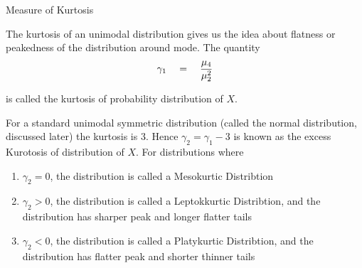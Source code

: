 \documentclass{article}
\begin{document}
\begin{ssection}{Measure of Kurtosis}

	The kurtosis of an unimodal distribution gives us the idea about flatness or peakedness of the distribution around mode. The quantity
	\begin{align*}
		\gamma_1	\quad = \quad	\frac{\mu_4}{\mu_2^2}
	\end{align*}

	is called the kurtosis of probability distribution of $X$. \br

	For a standard unimodal symmetric distribution (called the normal distribution, discussed later) the kurtosis is 3. Hence $\gamma_2 = \gamma_1 - 3$ is known as the excess Kurotosis of distribution of $X$. For distributions where \br

	\begin{enumerate}[label=(\roman*)]
		\item $\gamma_2 = 0$, the distribution is called a Mesokurtic Distribtion
		\item $\gamma_2 > 0$, the distribution is called a Leptokkurtic Distribtion, and the distribution has sharper peak and longer flatter tails
		\item $\gamma_2 < 0$, the distribution is called a Platykurtic Distribtion, and the distribution has flatter peak and shorter thinner tails
	\end{enumerate}

\end{ssection}
\end{document}
